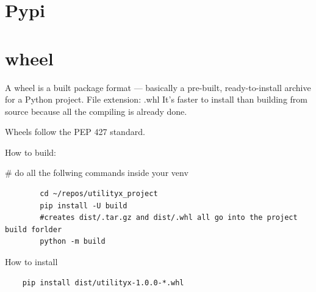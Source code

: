 \section{Pypi}

\section{wheel}
    A wheel is a built package format — basically a pre-built, ready-to-install archive for a Python project.
    File extension: .whl
    It’s faster to install than building from source because all the compiling is already done.
    
    Wheels follow the PEP 427 standard.
    
    How to build:
    
    \# do all the follwing commands inside your venv
    
    \begin{verbatim}
        cd ~/repos/utilityx_project
        pip install -U build
        #creates dist/.tar.gz and dist/.whl all go into the project build forlder
        python -m build
    \end{verbatim}
    
    How to install
    
    \begin{verbatim}
    pip install dist/utilityx-1.0.0-*.whl
    \end{verbatim}